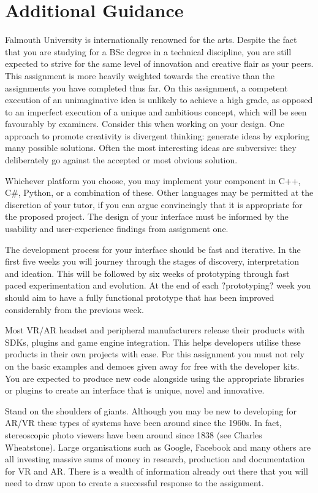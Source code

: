 \documentclass{../fal_assignment}
\begin{document}
\section*{Additional Guidance}
Falmouth University is internationally renowned for the arts. Despite the fact that you are studying for a BSc degree in a technical discipline, you are still expected to strive for the same level of innovation and creative flair as your peers. This assignment is more heavily weighted towards the creative than the assignments you have completed thus far. On this assignment, a competent execution of an unimaginative idea is unlikely to achieve a high grade, as opposed to an imperfect execution of a unique and ambitious concept, which will be seen favourably by examiners. Consider this when working on your design. One approach to promote creativity is divergent thinking: generate ideas by exploring many possible solutions. Often the most interesting ideas are subversive: they deliberately go against the accepted or most obvious solution.

Whichever platform you choose, you may implement your component in C++, C\#, Python, or a combination of these. Other languages may be permitted at the discretion of your tutor, if you can argue convincingly that it is appropriate for the proposed project. The design of your interface must be informed by the usability and user-experience findings from assignment one. 

The development process for your interface should be fast and iterative. In the first five weeks you will journey through the stages of discovery, interpretation and ideation. This will be followed by six weeks of prototyping through fast paced experimentation and evolution. At the end of each ?prototyping? week you should aim to have a fully functional prototype that has been improved considerably from the previous week. 

Most VR/AR headset and peripheral manufacturers release their products with SDKs, plugins and game engine integration. This helps developers utilise these products in their own projects with ease. For this assignment you must not rely on the basic examples and demoes given away for free with the developer kits.  You are expected to produce new code alongside using the appropriate libraries or plugins to create an interface that is unique, novel and innovative. 

Stand on the shoulders of giants. Although you may be new to developing for AR/VR these types of systems have been around since the 1960s. In fact, stereoscopic photo viewers have been around since 1838 (see Charles Wheatstone). Large organisations such as Google, Facebook and many others are all investing massive sums of money in research, production and documentation for VR and AR. There is a wealth of information already out there that you will need to draw upon to create a successful response to the assignment. 
\end{document}

